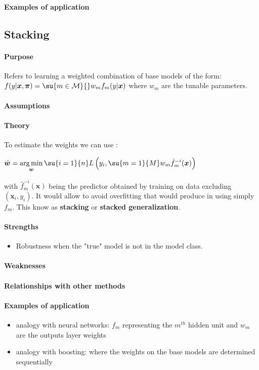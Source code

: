 \paragraph{Examples of application}


\subsection{Stacking}
\paragraph{Purpose}
Refers to learning a weighted combination of base models of the form:
$f(y|\bm{x},\bm{\pi}) = \su{m\in\mathcal{M}}{}w_{m}f_{m}(y|\bm{x})$ where $w_{m}$ are
the tunable parameters.
\paragraph{Assumptions}
\paragraph{Theory}
To estimate the weights we can use : 
\begin{center}
    $\hat{\bm{w}} = \displaystyle\argmin_{\bm{
w}}\su{i=1}{n}L\left(y_{i},\su{m=1}{M}w_{m}\hat{f}_{m}^{-i}(\bm{x})\right)$
\end{center}
with 
$\hat{f}_{m}^{-i}(\bm{x})$ being the predictor obtained by training on data excluding
$(\bm{x}_{i},y_{i})$. It would allow to avoid overfitting that would produce in using
simply $f_{m}$. This know as \textbf{stacking} or \textbf{stacked generalization}.
\paragraph{Strengths}
\begin{itemize}
    \item Robustness when the "true" model is not in the model class.
\end{itemize}

\paragraph{Weaknesses}
\paragraph{Relationships with other methods}
\paragraph{Examples of application}
\begin{itemize}
    \item analogy with neural networks: $f_{m}$ representing the $m^{th}$ hidden unit 
        and $w_{m}$ are the outputs layer weights
    \item analogy with boosting: where the weights on the base models are determined 
        sequentially
\end{itemize}



